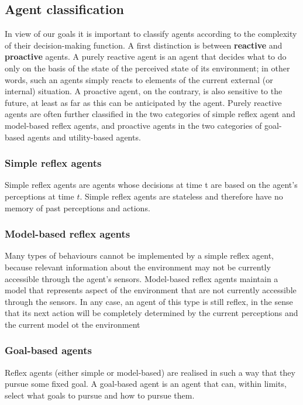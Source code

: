 \subsection{Agent classification}
In view of our goals it is important to classify agents according to the complexity of their
decision-making function.\newline
\newline
A first distinction is between \textbf{reactive} and \textbf{proactive} agents. A purely
reactive agent is an agent that decides what to do only on the basis of the state of the perceived state of
its environment; in other words, such an agents simply reacts to elements of the current external (or
internal) situation. A proactive agent, on the contrary, is also sensitive to the future, at least as far as
this can be anticipated by the agent.\newline
\newline
Purely reactive agents are often further classified in the two categories of simple
reflex agent and model-based reflex agents, and proactive agents in the two categories of goal-based
agents and utility-based agents.
\subsubsection*{Simple reflex agents}
Simple reflex agents are agents whose decisions at time t are based on the agent’s
perceptions at time $t$.\newline
Simple reflex agents are stateless and therefore have no memory of past perceptions and
actions.
\subsubsection*{Model-based reflex agents}
Many types of behaviours cannot be implemented by a simple reflex agent, because
relevant information about the environment may not be currently accessible through the
agent’s sensors.\newline
Model-based reflex agents maintain a model that represents aspect of the environment
that are not currently accessible through the sensors.\newline
In any case, an agent of this type is still reflex, in the sense that its next action will be
completely determined by the current perceptions and the current model ot the
environment
\subsubsection*{Goal-based agents}
Reflex agents (either simple or model-based) are realised in such a way that they pursue
some fixed goal.\newline
A goal-based agent is an agent that can, within limits, select what goals to pursue and how
to pursue them.